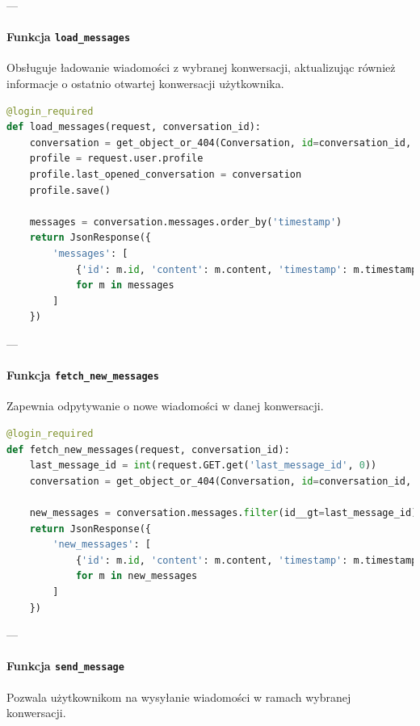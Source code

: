 \documentclass[12pt,a4paper,oneside]{article}
\theoremstyle{definition}
\numberwithin{equation}{section}
\begin{document}
---

\paragraph{Funkcja \texttt{load\_messages}}
Obsługuje ładowanie wiadomości z wybranej konwersacji, aktualizując również informacje o ostatnio otwartej konwersacji użytkownika.

\begin{lstlisting}[language=Python, caption=Funkcja \texttt{load\_messages}]
@login_required
def load_messages(request, conversation_id):
    conversation = get_object_or_404(Conversation, id=conversation_id, participants=request.user)
    profile = request.user.profile
    profile.last_opened_conversation = conversation
    profile.save()

    messages = conversation.messages.order_by('timestamp')
    return JsonResponse({
        'messages': [
            {'id': m.id, 'content': m.content, 'timestamp': m.timestamp.strftime('%H:%M'), 'sender': m.sender.username}
            for m in messages
        ]
    })
\end{lstlisting}

---

\paragraph{Funkcja \texttt{fetch\_new\_messages}}
Zapewnia odpytywanie o nowe wiadomości w danej konwersacji.

\begin{lstlisting}[language=Python, caption=Funkcja \texttt{fetch\_new\_messages}]
@login_required
def fetch_new_messages(request, conversation_id):
    last_message_id = int(request.GET.get('last_message_id', 0))
    conversation = get_object_or_404(Conversation, id=conversation_id, participants=request.user)

    new_messages = conversation.messages.filter(id__gt=last_message_id).order_by('timestamp')
    return JsonResponse({
        'new_messages': [
            {'id': m.id, 'content': m.content, 'timestamp': m.timestamp.strftime('%H:%M'), 'sender': m.sender.username}
            for m in new_messages
        ]
    })
\end{lstlisting}

---

\paragraph{Funkcja \texttt{send\_message}}
Pozwala użytkownikom na wysyłanie wiadomości w ramach wybranej konwersacji.
\end{document}
